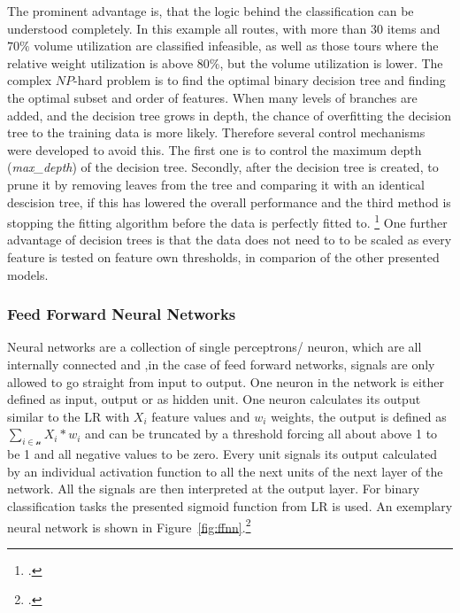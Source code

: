 
The  prominent advantage is, that the logic behind the classification can be understood
completely. In this example all routes, with more than 30 items and $70\%$ volume utilization are classified infeasible,
as well as those tours where the relative weight utilization is above $80\%$, but the volume utilization is lower. The complex
$NP$-hard problem is to find the optimal binary decision tree and finding the optimal subset and order of
features.
When many levels of branches are added, and the decision tree grows in depth, the chance of
overfitting the decision tree to the training data is more likely. Therefore several control mechanisms
were developed to avoid this. The first one is to control the maximum depth (\textit{max\_depth})
of the decision tree. Secondly, after the decision tree is created, to prune it by removing leaves from
the tree and comparing it with an identical descision tree, if this has lowered the overall performance
and the third method is stopping the fitting algorithm before the data is perfectly fitted to. \footcite[cf.][p.252]{kotsiantis_supervised_2007}
One further advantage of decision trees is that the data does not need to to be scaled as every feature is
tested on feature own thresholds, in comparion of the other presented models.

\subsubsection{Feed Forward Neural Networks}

Neural networks are a collection of single perceptrons/ neuron, which are all internally connected and
,in the case of feed forward networks, signals are only allowed to go straight from input to output. One neuron
in the network is either defined as input, output or as hidden unit. One neuron calculates its
output similar to the \gls{LR} with $X_i$ feature values and $w_i$ weights, the output is defined
as $\sum_{i \in \mathcal{n}} X_i * w_i$ and can be truncated by a threshold forcing all about above 1
to be 1 and all negative values to be zero. Every unit signals its output calculated by an individual
activation function to all the next units of the next layer of the network. All the signals are
then interpreted at the output layer. For binary classification tasks the presented sigmoid function from \gls{LR} is used.
An exemplary neural network is shown in Figure~\ref{fig:ffnn}.\footcite[cf.][p.255]{kotsiantis_supervised_2007}



